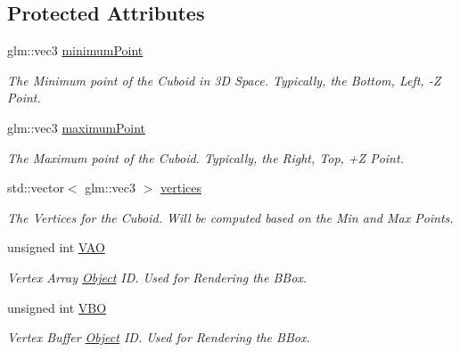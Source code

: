 \subsection*{Protected Attributes}
\begin{DoxyCompactItemize}
\item 
\mbox{\label{classpiolot_1_1_bounding_box_a9e1b1896cdc55746ab9903241c358dc4}} 
glm\+::vec3 \mbox{\hyperlink{classpiolot_1_1_bounding_box_a9e1b1896cdc55746ab9903241c358dc4}{minimum\+Point}}
\begin{DoxyCompactList}\small\item\em The Minimum point of the Cuboid in 3D Space. Typically, the Bottom, Left, -\/Z Point. \end{DoxyCompactList}\item 
\mbox{\label{classpiolot_1_1_bounding_box_a4b6af7e1b8cb46c8967a8921146097bd}} 
glm\+::vec3 \mbox{\hyperlink{classpiolot_1_1_bounding_box_a4b6af7e1b8cb46c8967a8921146097bd}{maximum\+Point}}
\begin{DoxyCompactList}\small\item\em The Maximum point of the Cuboid. Typically, the Right, Top, +Z Point. \end{DoxyCompactList}\item 
\mbox{\label{classpiolot_1_1_bounding_box_ae57572db987c9f1185ad73febc8fbc28}} 
std\+::vector$<$ glm\+::vec3 $>$ \mbox{\hyperlink{classpiolot_1_1_bounding_box_ae57572db987c9f1185ad73febc8fbc28}{vertices}}
\begin{DoxyCompactList}\small\item\em The Vertices for the Cuboid. Will be computed based on the Min and Max Points. \end{DoxyCompactList}\item 
\mbox{\label{classpiolot_1_1_bounding_box_ad5ea73dcadf0d25c07cc8ff3761db4e3}} 
unsigned int \mbox{\hyperlink{classpiolot_1_1_bounding_box_ad5ea73dcadf0d25c07cc8ff3761db4e3}{V\+AO}}
\begin{DoxyCompactList}\small\item\em Vertex Array \mbox{\hyperlink{classpiolot_1_1_object}{Object}} ID. Used for Rendering the B\+Box. \end{DoxyCompactList}\item 
\mbox{\label{classpiolot_1_1_bounding_box_a4c8c26e00dff9f14709bc2803b38a0bf}} 
unsigned int \mbox{\hyperlink{classpiolot_1_1_bounding_box_a4c8c26e00dff9f14709bc2803b38a0bf}{V\+BO}}
\begin{DoxyCompactList}\small\item\em Vertex Buffer \mbox{\hyperlink{classpiolot_1_1_object}{Object}} ID. Used for Rendering the B\+Box. \end{DoxyCompactList}\end{DoxyCompactItemize}


